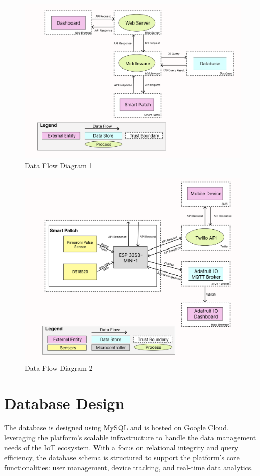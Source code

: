 \begin{figure}[h!]
    \centering
    \includegraphics[width=1\linewidth]{images/system-design-data-flow-full.png}
    \caption{Data Flow Diagram 1}
    \label{fig:dfd-1}
\end{figure}

\begin{figure}[h!]
    \centering
    \includegraphics[width=1\linewidth]{images/system-design-data-flow-smart-patch.png}
    \caption{Data Flow Diagram 2}
    \label{fig:dfd-2}
\end{figure}


\newpage
\section{Database Design}
The database is designed using MySQL and is hosted on Google Cloud, leveraging the platform's scalable infrastructure to handle the data management needs of the IoT ecosystem. With a focus on relational integrity and query efficiency, the database schema is structured to support the platform's core functionalities: user management, device tracking, and real-time data analytics.\\

